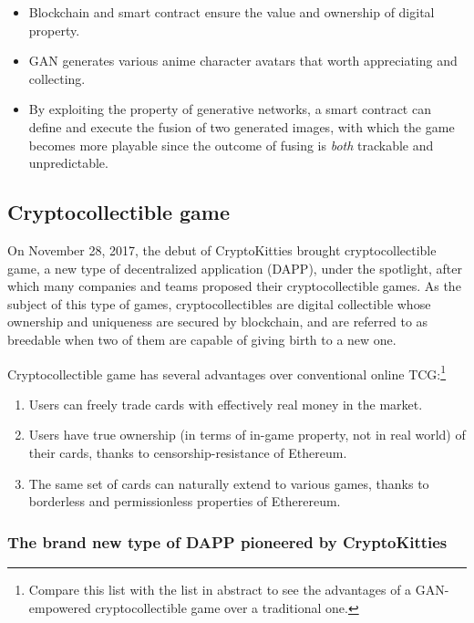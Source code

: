 \documentclass[a4paper]{article}
\begin{document}
\begin{itemize}
\item Blockchain and smart contract ensure the value and ownership of digital property.
\item GAN generates various anime character avatars that worth appreciating and collecting.
\item By exploiting the property of generative networks, a smart contract can define and execute the fusion of two generated images, with which the game becomes more playable since the outcome of fusing is \emph{both} trackable and unpredictable. 
\end{itemize}

\subsection{Cryptocollectible game}

On November 28, 2017, the debut of CryptoKitties\cite{cryptokitties} brought cryptocollectible game, a new type of decentralized application (DAPP), under the spotlight, after which many companies and teams proposed their cryptocollectible games\cite{cryptomons,cryptocountries,cryptopets,cryptoarts,cryptolandmarks,cryptofighters,etheremon,etherwaifu}. As the subject of this type of games, cryptocollectibles are digital collectible whose ownership and uniqueness are secured by blockchain, and are referred to as breedable when two of them are capable of giving birth to a new one.

Cryptocollectible game has several advantages over conventional online TCG:\footnote{Compare this list with the list in abstract to see the advantages of a GAN-empowered cryptocollectible game over a traditional one.}
\begin{enumerate}
\item Users can freely trade cards with effectively real money in the market.
\item Users have true ownership (in terms of in-game property, not in real world) of their cards, thanks to censorship-resistance of Ethereum.
\item The same set of cards can naturally extend to various games, thanks to borderless and permissionless properties of Etherereum.
\end{enumerate}

\subsubsection{The brand new type of DAPP pioneered by CryptoKitties}
\end{document}
